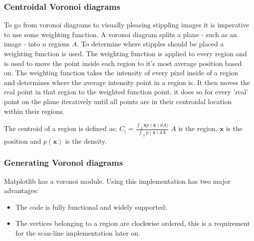 \let\Oldsubsubsection\subsubsection
\renewcommand{\subsubsection}{\FloatBarrier\Oldsubsubsection}
\subsubsection{Centroidal Voronoi diagrams}
To go from voronoi diagrams to visually pleasing stippling images it is imperative to use some weighting function. A voronoi diagram splits a plane - such as an image - into \(n\) regions \(A\). To determine where stipples should be placed a weighting function is used. The weighting function is applied to every region and is used to move the point inside each region to it's most average position based on. The weighting function takes the intensity of every pixel inside of a region and determines where the average intensity point in a region is. It then moves the real point in that region to the weighted function point. it does so for every 'real' point on the plane iteratively until all points are in their centroidal location within their regions.

The centroid of a region is defined as: \(C_i = \frac{\int_A \pmb{x}p(\pmb{x})dA)}{\int_A p(\pmb{x})dA}\)\newline
\(A\) is the region, \(\pmb{x}\) is the position and \(p(\pmb{x})\) is the density\cite{Secord:2002}.\newline

\subsubsection{Generating Voronoi diagrams}
Matplotlib has a voronoi module. Using this implementation has two major advantages:

\begin{itemize}
  \item The code is fully functional and widely supported;
  \item The vertices belonging to a region are clockwise ordered, this is a requirement for the scan-line implementation later on.
\end{itemize}

\label{DensityFunctionSection}
